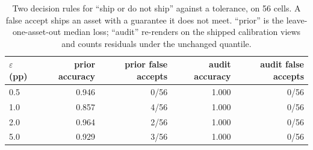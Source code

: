 \begin{table}[t]
\centering
\small
\footnotesize
\setlength{\tabcolsep}{2.8pt}
\caption{Two decision rules for ``ship or do not ship'' against a tolerance, on 56 cells. A false accept ships an asset with a guarantee it does not meet. ``prior'' is the leave-one-asset-out median loss; ``audit'' re-renders on the shipped calibration views and counts residuals under the unchanged quantile.}
\label{tab:decision}
\begin{tabular}{lrrrr}
\toprule
$\varepsilon$ (pp) & prior accuracy & prior false accepts & audit accuracy & audit false accepts \\
\midrule
0.5 & 0.946 & 0/56 & 1.000 & 0/56 \\
1.0 & 0.857 & 4/56 & 1.000 & 0/56 \\
2.0 & 0.964 & 2/56 & 1.000 & 0/56 \\
5.0 & 0.929 & 3/56 & 1.000 & 0/56 \\
\bottomrule
\end{tabular}
\end{table}
